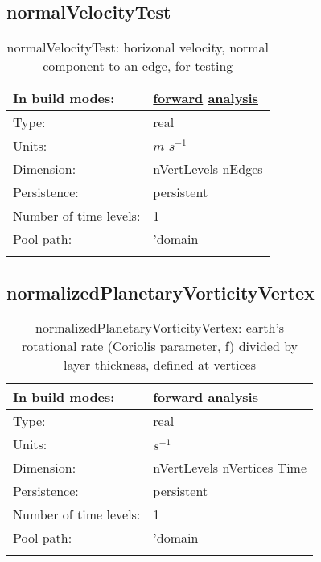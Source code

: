 \subsection[normalVelocityTest]{normalVelocityTest}
\label{subsec:var_sec_scratch_normalVelocityTest}
\begin{center}
\begin{longtable}{| p{2.0in} | p{4.0in} |}
        \hline 
        In build modes: & \hyperref[subsec:forward_var_tab_scratch]{forward} \hyperref[subsec:analysis_var_tab_scratch]{analysis} \\
        \hline 
        Type: & real \\
        \hline 
        Units: & $m$ $s^{-1}$ \\
        \hline 
        Dimension: & nVertLevels nEdges \\
        \hline 
        Persistence: & persistent \\
        \hline 
        Number of time levels: & 1 \\
        \hline 
            Pool path: & 'domain %
 \\
		 \hline 
    \caption{normalVelocityTest: horizonal velocity, normal component to an edge, for testing}
\end{longtable}
\end{center}
\subsection[normalizedPlanetaryVorticityVertex]{normalizedPlanetaryVorticityVertex}
\label{subsec:var_sec_scratch_normalizedPlanetaryVorticityVertex}
\begin{center}
\begin{longtable}{| p{2.0in} | p{4.0in} |}
        \hline 
        In build modes: & \hyperref[subsec:forward_var_tab_scratch]{forward} \hyperref[subsec:analysis_var_tab_scratch]{analysis} \\
        \hline 
        Type: & real \\
        \hline 
        Units: & $s^{-1}$ \\
        \hline 
        Dimension: & nVertLevels nVertices Time \\
        \hline 
        Persistence: & persistent \\
        \hline 
        Number of time levels: & 1 \\
        \hline 
            Pool path: & 'domain %
 \\
		 \hline 
    \caption{normalizedPlanetaryVorticityVertex: earth's rotational rate (Coriolis parameter, f) divided by layer thickness, defined at vertices}
\end{longtable}
\end{center}
